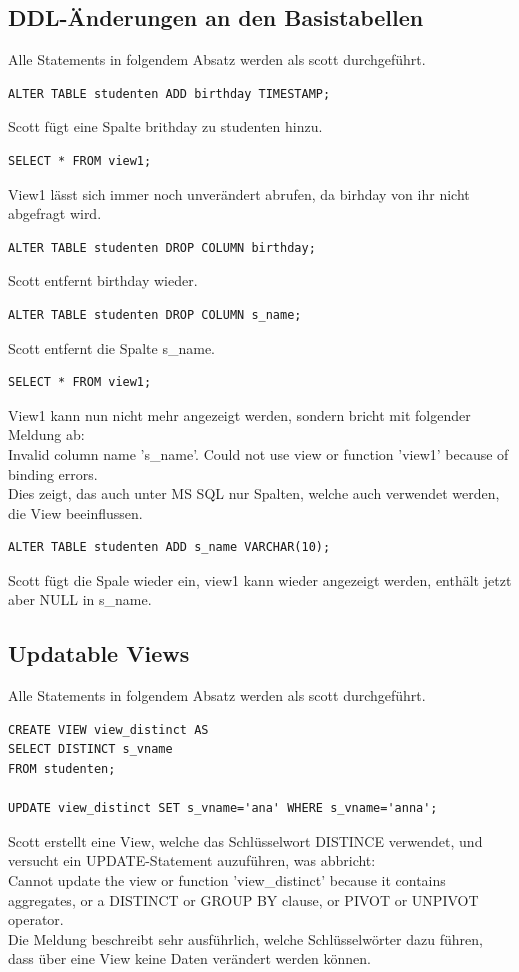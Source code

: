 \documentclass[10pt]{scrreprt}
\begin{document}
\subsection{DDL-Änderungen an den Basistabellen}
Alle Statements in folgendem Absatz werden als scott durchgeführt.
\begin{lstlisting}[style=sql]
ALTER TABLE studenten ADD birthday TIMESTAMP;
\end{lstlisting}
Scott fügt eine Spalte brithday zu studenten hinzu.

\begin{lstlisting}[style=sql]
SELECT * FROM view1;
\end{lstlisting}
View1 lässt sich immer noch unverändert abrufen, da birhday von ihr nicht abgefragt wird.

\begin{lstlisting}[style=sql]
ALTER TABLE studenten DROP COLUMN birthday;
\end{lstlisting}
Scott entfernt birthday wieder.

\begin{lstlisting}[style=sql]
ALTER TABLE studenten DROP COLUMN s_name;
\end{lstlisting}
Scott entfernt die Spalte s\_name.

\begin{lstlisting}[style=sql]
SELECT * FROM view1;
\end{lstlisting}
View1 kann nun nicht mehr angezeigt werden, sondern bricht mit folgender Meldung ab:\\
Invalid column name 's\_name'.
Could not use view or function 'view1' because of binding errors.\\
Dies zeigt, das auch unter MS SQL nur Spalten, welche auch verwendet werden, die View beeinflussen.

\begin{lstlisting}[style=sql]
ALTER TABLE studenten ADD s_name VARCHAR(10);
\end{lstlisting}
Scott fügt die Spale wieder ein, view1 kann wieder angezeigt werden, enthält jetzt aber NULL in s\_name.

\subsection{Updatable Views}
Alle Statements in folgendem Absatz werden als scott durchgeführt.
\begin{lstlisting}[style=sql]
CREATE VIEW view_distinct AS
SELECT DISTINCT s_vname
FROM studenten;

UPDATE view_distinct SET s_vname='ana' WHERE s_vname='anna';
\end{lstlisting}
Scott erstellt eine View, welche das Schlüsselwort DISTINCE verwendet, und versucht ein UPDATE-Statement auzuführen, was abbricht:\\
Cannot update the view or function 'view\_distinct' because it contains aggregates, or a DISTINCT or GROUP BY clause, or PIVOT or UNPIVOT operator.\\
Die Meldung beschreibt sehr ausführlich, welche Schlüsselwörter dazu führen, dass über eine View keine Daten verändert werden können.
\end{document}
